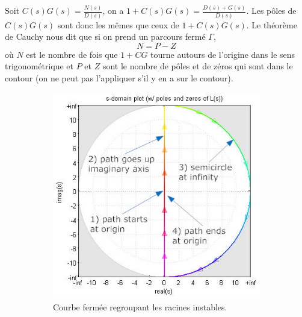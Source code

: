 Soit $C(s)G(s) = \frac{N(s)}{D(s)}$, on a $1 + C(s)G(s) = \frac{D(s)+G(s)}{D(s)}$.
Les pôles de $C(s)G(s)$ sont donc les mêmes que ceux de $1 + C(s)G(s)$.
Le théorème de Cauchy nous dit que si on prend un parcours fermé $\Gamma$,
\[ N = P - Z \]
où $N$ est le nombre de fois que $1 + CG$ tourne autours de l'origine dans le sens
trigonométrique et $P$ et $Z$ sont le nombre de pôles et de zéros qui sont dans
le contour (on ne peut pas l'appliquer s'il y en a sur le contour).

\begin{figure}
  \centering
  \begin{subfigure}{0.49\linewidth}
    \includegraphics[width=\linewidth,height=\linewidth]{nyquistpath.jpg}
    \caption{Courbe fermée regroupant les racines instables.}
    \label{fig:nyquistpath}
  \end{subfigure}
  \begin{subfigure}{0.49\linewidth}

\end{subfigure}
\end{figure}
